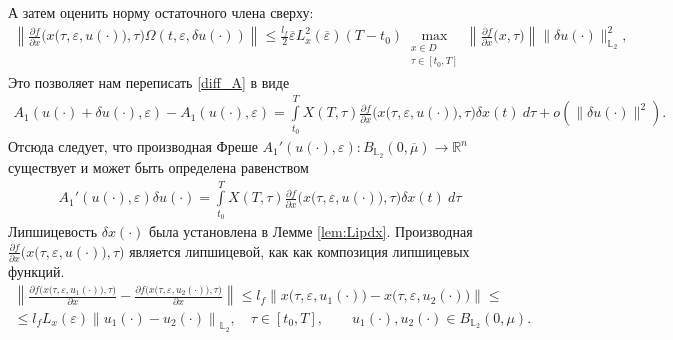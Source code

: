 \documentclass[../main.tex]{subfiles}
\begin{document}
А затем оценить норму остаточного члена сверху:
\begin{gather*}
    \left\| 
    \frac{\partial f}{\partial x} \Big(x\big(\tau,\varepsilon, u(\cdot)\big), \tau\Big) \Omega(t,\varepsilon, \delta u(\cdot)) 
    \right\| 
    \leqslant
    \frac{l_f}{2}
    \overline{\varepsilon} 
    L_x^2(\overline{\varepsilon})
    (T-t_0)
    \max_{\substack{x\in D \\ \tau \in [t_0,T]}} 
    \left\|\frac{\partial f}{\partial x} \Big(x, \tau\Big) \right\|
    \|\delta u(\cdot)\|_{\mathbb{L}_2}^2,
\end{gather*}
Это позволяет нам переписать \eqref{diff_A} в виде
\begin{gather}
    A_1(u(\cdot) + \delta u(\cdot),\varepsilon) - A_1(u(\cdot) ,\varepsilon) = \int\limits_{t_0}^T X(T,\tau) \frac{\partial f}{\partial x}  \Big(x\big(\tau,\varepsilon, u(\cdot)\big), \tau\Big) \delta x(t) \ d\tau + o(\|\delta u(\cdot)\|^2).
\end{gather}
Отсюда следует, что производная Фреше  $A_1'(u(\cdot),\varepsilon): B_{\mathbb{L}_2}(0,\overline{\mu}) \to \mathbb{R}^n $ существует и может быть определена равенством
\begin{gather}\label{A1_diff}
    A_1'(u(\cdot),\varepsilon)\delta u(\cdot) = \int\limits_{t_0}^T X(T,\tau) \frac{\partial f}{\partial x}  \Big(x\big(\tau,\varepsilon, u(\cdot)\big), \tau\Big) \delta x(t) \ d\tau 
\end{gather}
Липшицевость $\delta x(\cdot)$ была установлена в Лемме \ref{lem:Lipdx}. 
Производная $\frac{\partial f}{\partial x} \Big(x\big(\tau,\varepsilon, u(\cdot)\big),\tau\Big)$ является липшицевой, как как композиция липшицевых функций.
\begin{gather*}
    \left\| \frac{\partial f \Big(x\big(\tau,\varepsilon, u_1(\cdot)\big),\tau\Big)} {\partial x} - \frac{\partial f \Big(x\big(\tau,\varepsilon, u_2(\cdot)\big),\tau\Big)} {\partial x} \right\| \leqslant l_f \left\|x\big(\tau,\varepsilon, u_1(\cdot) \big) - x\big(\tau,\varepsilon, u_2(\cdot)\big) \right\| \leqslant \\ \leqslant l_f L_x(\varepsilon) \left\| u_1(\cdot) - u_2(\cdot) \right\|_{\mathbb{L}_2}, \quad \tau \in [t_0, T], \qquad u_1(\cdot), u_2(\cdot) \in B_{\mathbb{L}_2}(0,\mu).
\end{gather*}
\end{document}
